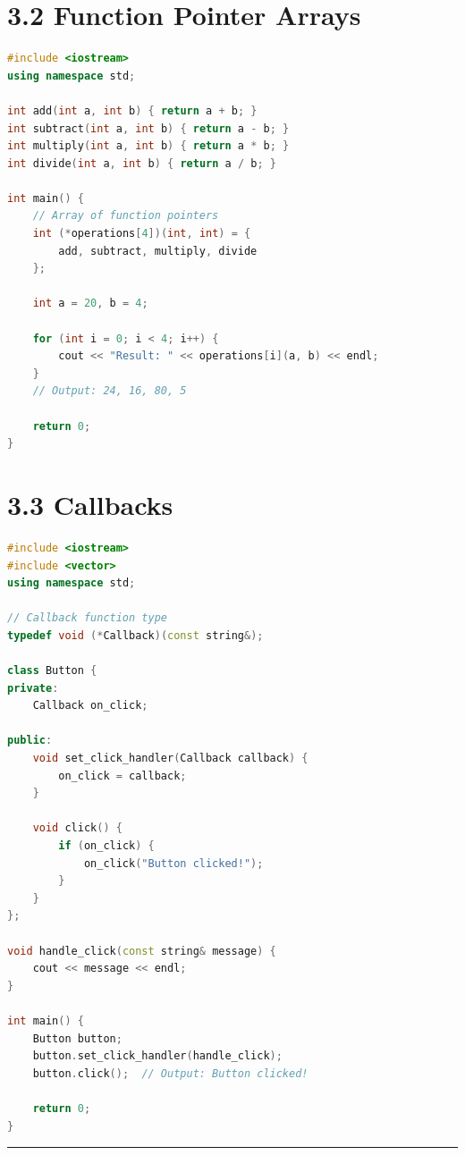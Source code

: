 \hypertarget{function-pointer-arrays}{%
\section{3.2 Function Pointer Arrays}\label{function-pointer-arrays}}

\begin{lstlisting}[language={C++}]
#include <iostream>
using namespace std;

int add(int a, int b) { return a + b; }
int subtract(int a, int b) { return a - b; }
int multiply(int a, int b) { return a * b; }
int divide(int a, int b) { return a / b; }

int main() {
    // Array of function pointers
    int (*operations[4])(int, int) = {
        add, subtract, multiply, divide
    };
    
    int a = 20, b = 4;
    
    for (int i = 0; i < 4; i++) {
        cout << "Result: " << operations[i](a, b) << endl;
    }
    // Output: 24, 16, 80, 5
    
    return 0;
}
\end{lstlisting}

\hypertarget{callbacks}{%
\section{3.3 Callbacks}\label{callbacks}}

\begin{lstlisting}[language={C++}]
#include <iostream>
#include <vector>
using namespace std;

// Callback function type
typedef void (*Callback)(const string&);

class Button {
private:
    Callback on_click;
    
public:
    void set_click_handler(Callback callback) {
        on_click = callback;
    }
    
    void click() {
        if (on_click) {
            on_click("Button clicked!");
        }
    }
};

void handle_click(const string& message) {
    cout << message << endl;
}

int main() {
    Button button;
    button.set_click_handler(handle_click);
    button.click();  // Output: Button clicked!
    
    return 0;
}
\end{lstlisting}

\begin{center}\rule{0.5\linewidth}{0.5pt}\end{center}

